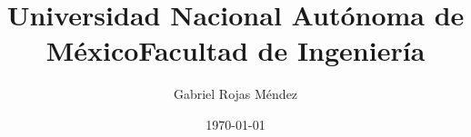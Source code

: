 \documentclass[12pt]{article}
\title{Universidad Nacional Autónoma de México}
\title{Facultad de Ingeniería}
\author{Gabriel Rojas Méndez}
\date{\today}
\begin{document}
	
	\be
\end{document}
